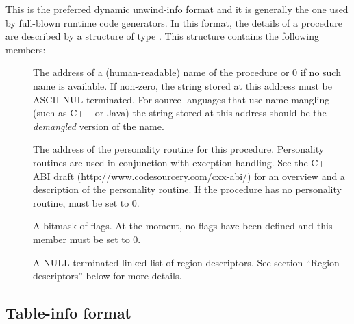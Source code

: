\documentclass{article}
\begin{document}
This is the preferred dynamic unwind-info format and it is generally
the one used by full-blown runtime code generators.  In this format,
the details of a procedure are described by a structure of type
.  This structure contains the following
members:
\begin{description}

\item[ ] The address of a
  (human-readable) name of the procedure or 0 if no such name is
  available.  If non-zero, the string stored at this address must be
  ASCII NUL terminated.  For source languages that use name mangling
  (such as C++ or Java) the string stored at this address should be
  the \emph{demangled} version of the name.

\item[ ] The address of the
  personality routine for this procedure.  Personality routines are
  used in conjunction with exception handling.  See the C++ ABI draft
  (http://www.codesourcery.com/cxx-abi/) for an overview and a
  description of the personality routine.  If the procedure has no
  personality routine,  must be set to 0.

\item[ ] A bitmask of flags.  At the
  moment, no flags have been defined and this member must be
  set to 0.

\item[] A NULL-terminated
  linked list of region descriptors.  See section ``Region
  descriptors'' below for more details.

\end{description}

\subsection{Table-info format}
\end{document}
